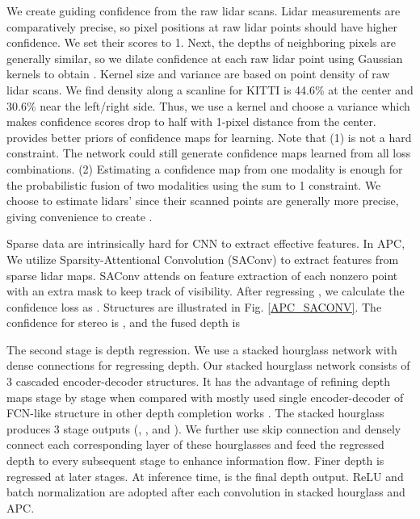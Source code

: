 \documentclass{article}
\begin{document}
We create guiding confidence  from the raw lidar scans. Lidar measurements are comparatively precise, so pixel positions at raw lidar points should have higher confidence. We set their scores to 1. Next, the depths of neighboring pixels are generally similar, so we dilate confidence at each raw lidar point using Gaussian kernels to obtain . Kernel size and variance are based on point density of raw lidar scans. We find density along a scanline for KITTI is 44.6\% at the center and 30.6\% near the left/right side. Thus, we use a  kernel and choose a variance which makes confidence scores drop to half with 1-pixel distance from the center.  provides better priors of confidence maps for learning. Note that (1)  is not a hard constraint. The network could still generate confidence maps learned from all loss combinations. (2) Estimating a confidence map from one modality is enough for the probabilistic fusion of two modalities using the sum to 1 constraint. We choose to estimate lidars' since their scanned points are generally more precise, giving convenience to create . 

Sparse data are intrinsically hard for CNN to extract effective features. In APC, We utilize Sparsity-Attentional Convolution (SAConv) \cite{zhong2019deep} to extract features from sparse lidar maps. SAConv attends on feature extraction of each nonzero point with an extra mask to keep track of visibility. After regressing , we calculate the confidence loss as . Structures are illustrated in Fig. \ref{APC_SACONV}. The confidence for stereo is , and the fused depth is 



The second stage is depth regression. We use a stacked hourglass network \cite{newell2016stacked} with dense connections for regressing depth. Our stacked hourglass network consists of 3 cascaded encoder-decoder structures. It has the advantage of refining depth maps stage by stage when compared with mostly used single encoder-decoder of FCN-like structure in other depth completion works \cite{ma2019self} \cite{Ma2017SparseToDense} \cite{zhong2019deep} \cite{Jaritz_2018}. The stacked hourglass produces 3 stage outputs (, , and ). We further use skip connection and densely connect each corresponding layer of these hourglasses and feed the regressed depth to every subsequent stage to enhance information flow. Finer depth is regressed at later stages. At inference time,  is the final depth output. ReLU \cite{nair2010rectified} and batch normalization \cite{ioffe2015batch} are adopted after each convolution in stacked hourglass and APC. 
\end{document}
